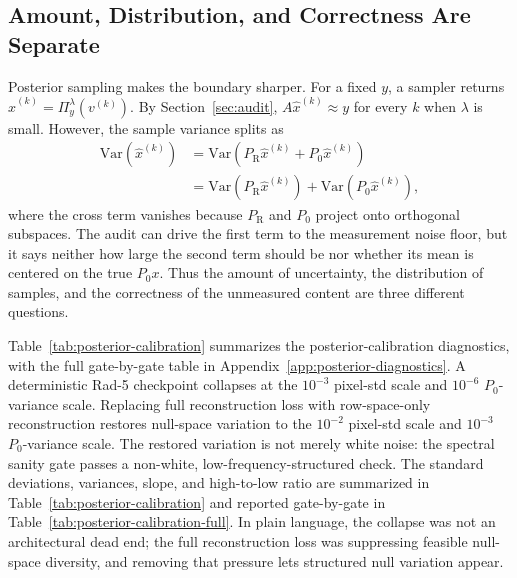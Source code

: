 \documentclass[journal]{IEEEtran}
\newcommand{\PR}{P_{\mathrm{R}}}
\newcommand{\PZ}{P_{0}}
\newcommand{\Audit}{\Pi_y^\lambda}
\begin{document}
\begin{table}[t]
\centering
\caption{The prior-supplied-content map $|\PZ\hat{x}|$ is not a pixelwise error
map on the $96\times96$ Rad-5 validation.  Spearman and Pearson correlations
are near zero.  For arms B and C, the top-10\% $|\PZ\hat{x}|$ pixels have lower
actual $\PZ$ error than the remaining pixels.}
\label{tab:p0-map}
\footnotesize
{}
\end{table}

\subsection{Amount, Distribution, and Correctness Are Separate}

Posterior sampling makes the boundary sharper.  For a fixed $y$, a sampler
returns $\hat{x}^{(k)}=\Audit(v^{(k)})$.  By Section~\ref{sec:audit},
$A\hat{x}^{(k)}\approx y$ for every $k$ when $\lambda$ is small.  However, the
sample variance splits as
\begin{align}
    \mathrm{Var}(\hat{x}^{(k)})
    &=
    \mathrm{Var}(\PR\hat{x}^{(k)}+\PZ\hat{x}^{(k)})                    \\
    &=
    \mathrm{Var}(\PR\hat{x}^{(k)})
    +
    \mathrm{Var}(\PZ\hat{x}^{(k)}),
    \label{eq:variance-split}
\end{align}
where the cross term vanishes because $\PR$ and $\PZ$ project onto orthogonal
subspaces.  The audit can drive the first term to the measurement noise floor,
but it says neither how large the second term should be nor whether its mean is
centered on the true $\PZ x$.  Thus the amount of uncertainty, the distribution
of samples, and the correctness of the unmeasured content are three different
questions.

Table~\ref{tab:posterior-calibration} summarizes the posterior-calibration
diagnostics, with the full gate-by-gate table in
Appendix~\ref{app:posterior-diagnostics}.  A deterministic Rad-5 checkpoint collapses at
the $10^{-3}$ pixel-std scale and $10^{-6}$ $\PZ$-variance scale.  Replacing
full reconstruction loss with row-space-only reconstruction restores null-space
variation to the $10^{-2}$ pixel-std scale and $10^{-3}$ $\PZ$-variance scale.
The restored variation is not merely white noise: the spectral sanity gate
passes a non-white, low-frequency-structured check.  The standard deviations,
variances, slope, and high-to-low ratio are summarized in
Table~\ref{tab:posterior-calibration} and reported gate-by-gate in
Table~\ref{tab:posterior-calibration-full}.  In plain language, the collapse was not
an architectural dead end; the full reconstruction loss was suppressing
feasible null-space diversity, and removing that pressure lets structured null
variation appear.
\end{document}
